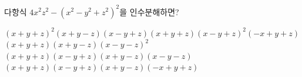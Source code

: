 다항식 $4x^2z^2-(x^2-y^2+z^2)^2$을 인수분해하면?
\begin{choicesv}{$(x+y+z)^2(x+y-z)(x-y+z)$}{$(x+y+z)(x-y+z)^2(-x+y+z)$}{$(x+y+z)(x+y-z)(x-y-z)^2$}{$(x+y+z)(x-y+z)(x+y-z)(x-y-z)$}{$(x+y+z)(x-y+z)(x+y-z)(-x+y+z)$}\end{choicesv}
